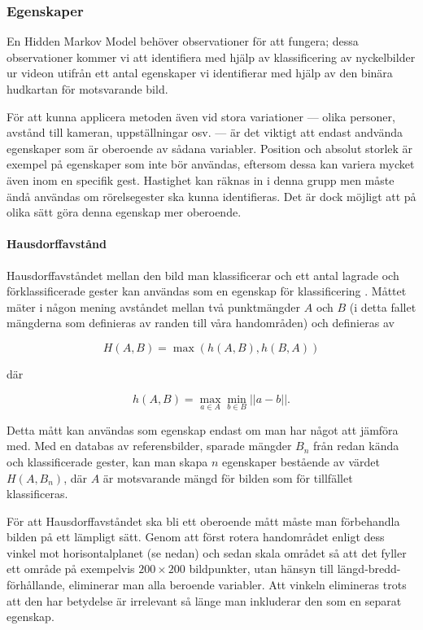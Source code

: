 \documentclass[klassificering]{subfiles}
\begin{document}
\subsubsection{Egenskaper}
En Hidden Markov Model behöver observationer för att fungera; dessa
observationer kommer vi att identifiera med hjälp av klassificering av
nyckelbilder ur videon utifrån ett antal egenskaper vi identifierar
med hjälp av den binära hudkartan för motsvarande bild.

För att kunna applicera metoden även vid stora variationer --- olika
personer, avstånd till kameran, uppställningar osv. --- är det viktigt
att endast andvända egenskaper som är oberoende av sådana variabler.
Position och absolut storlek är exempel på egenskaper som inte bör
användas, eftersom dessa kan variera mycket även inom en specifik
gest. Hastighet kan räknas in i denna grupp men måste ändå användas
om rörelsegester ska kunna identifieras. Det är dock möjligt att på
olika sätt göra denna egenskap mer oberoende.

\paragraph{Hausdorffavstånd}

Hausdorffavståndet mellan den bild man klassificerar och ett antal
lagrade och förklassificerade gester kan användas som en egenskap för
klassificering \cite{Nielsen04}. Måttet mäter i någon mening avståndet
mellan två punktmängder $A$ och $B$ (i detta fallet mängderna som definieras av
randen till våra handområden) och definieras av

\begin{equation*}
  H(A, B) = \max\left(h(A,B),h(B, A)\right)
\end{equation*}

där

\begin{equation*}
  h(A, B) = \max\limits_{a\in A}\min\limits_{b\in
  B}\left|\left|a-b\right|\right|.
\end{equation*}

Detta mått kan användas som egenskap endast om man har något att
jämföra med. Med en databas av referensbilder, sparade mängder $B_n$ från redan kända
och klassificerade gester, kan man skapa $n$ egenskaper bestående av
värdet $H(A,B_n)$, där $A$ är motsvarande mängd för bilden som för
tillfället klassificeras.

För att Hausdorffavståndet ska bli ett oberoende mått måste man
förbehandla bilden på ett lämpligt sätt. Genom att först rotera
handområdet enligt dess vinkel mot horisontalplanet (se nedan)
och sedan skala området så att det fyller ett
område på exempelvis $200\times200$ bildpunkter, utan hänsyn till
längd-bredd-förhållande, eliminerar man alla beroende variabler. Att
vinkeln elimineras trots att den har betydelse är irrelevant så länge
man inkluderar den som en separat egenskap.
\end{document}
